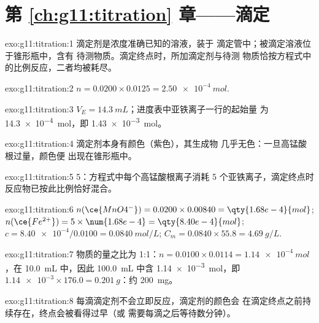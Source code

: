 \section*{第 \ref{ch:g11:titration} 章——滴定}

\begin{solution}{exo:g11:titration:1}
滴定剂是浓度准确已知的溶液，装于
滴定管中；被滴定溶液位于锥形瓶中，含有
待测物质。滴定终点时，所加滴定剂与待测
物质恰按方程式中的比例反应，二者均被耗尽。
\end{solution}

\begin{solution}{exo:g11:titration:2}
$n = 0.0200 \times 0.0125 = \qty{2.50e-4}{mol}$.
\end{solution}

\begin{solution}{exo:g11:titration:3}
$V_E = \qty{14.3}{mL}$；进度表中亚铁离子一行的起始量
为 \qty{14.3e-4}{mol}，即 \qty{1.43e-3}{mol}。
\end{solution}

\begin{solution}{exo:g11:titration:4}
滴定剂本身有颜色（紫色），其生成物
几乎无色：一旦高锰酸根过量，颜色便
出现在锥形瓶中。
\end{solution}

\begin{solution}{exo:g11:titration:5}
5：方程式中每个高锰酸根离子消耗 5 个亚铁离子，滴定终点时
反应物已按此比例恰好混合。
%
\end{solution}

\begin{solution}{exo:g11:titration:6}
$n(\ce{MnO4^-}) = 0.0200 \times 0.00840 = \qty{1.68e-4}{mol}$;
$n(\ce{Fe^{2+}}) = 5 \times \num{1.68e-4} = \qty{8.40e-4}{mol}$;
$c = \num{8.40e-4} / 0.0100 = \qty{0.0840}{mol/L}$;
$C_m = 0.0840 \times 55.8 = \qty{4.69}{g/L}$.
\end{solution}

\begin{solution}{exo:g11:titration:7}
物质的量之比为 1:1：$n = 0.0100 \times 0.0114 = \qty{1.14e-4}{mol}$，在
\qty{10.0}{mL} 中，因此 \qty{100.0}{mL} 中含 \qty{1.14e-3}{mol}，即
$\num{1.14e-3} \times 176.0 = \qty{0.201}{g}$：约 \qty{200}{mg}。
\end{solution}

\begin{solution}{exo:g11:titration:8}
每滴滴定剂不会立即反应，滴定剂的颜色会
在滴定终点之前持续存在，终点会被看得过早（或
需要每滴之后等待数分钟）。
\end{solution}

